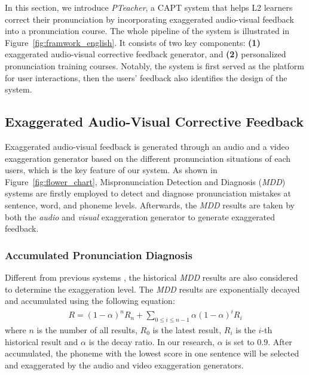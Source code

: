 \documentclass[sigconf]{acmart}
\begin{document}
In this section, we introduce \textit{PTeacher}, a CAPT system that helps L2 learners correct their pronunciation by incorporating exaggerated audio-visual feedback into a pronunciation course.
%
The whole pipeline of the system is illustrated in Figure~\ref{fig:framwork_english}. 
It consists of two key components: \textbf{(1)} exaggerated audio-visual corrective feedback generator, and \textbf{(2)} personalized pronunciation training courses. 
%
Notably, the system is first served as the platform for user interactions, then the users' feedback also identifies the design of the system.
%


\subsection{Exaggerated Audio-Visual Corrective Feedback}

Exaggerated audio-visual feedback is generated through an audio and a video exaggeration generator based on the different pronunciation situations of each users, which is the key feature of our system.
As shown in Figure~\ref{fig:flower_chart},
Mispronunciation Detection and Diagnosis (\textit{MDD}) systems \cite{li2016mispronunciation,li2015integrating,li2015rating} are firstly employed to detect and diagnose pronunciation mistakes at sentence, word, and phoneme levels.
Afterwards, the \textit{MDD} results are taken by both the \textit{audio} and \textit{visual} exaggeration generator to generate exaggerated feedback.



\subsubsection{Accumulated Pronunciation Diagnosis}
\label{sec:3.1.1}
Different from previous systems \cite{zhao2013audiovisual}, the historical \textit{MDD} results are also considered to determine the exaggeration level. The \textit{MDD} results are exponentially decayed and accumulated using the following equation:
\begin{align}
R=(1-\alpha)^{n}R_{n}+\sum_{0\leq i\leq n-1}\alpha(1-\alpha)^{i}R_{i}
\end{align}
where $n$ is the number of all results, $R_0$ is the latest result, $R_i$ is the $i$-th historical result and $\alpha$ is the decay ratio. In our research, $\alpha$ is set to $0.9$.
After accumulated, the phoneme with the lowest score in one sentence will be selected and exaggerated by the audio and video exaggeration generators.
\end{document}
